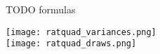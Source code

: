 TODO formulas

\texttt{[image: ratquad\_variances.png]} \\
\texttt{[image: ratquad\_draws.png]} \\


% 
% 
% 


% 
% 
% 
% 
% 
% 
% 
% 


